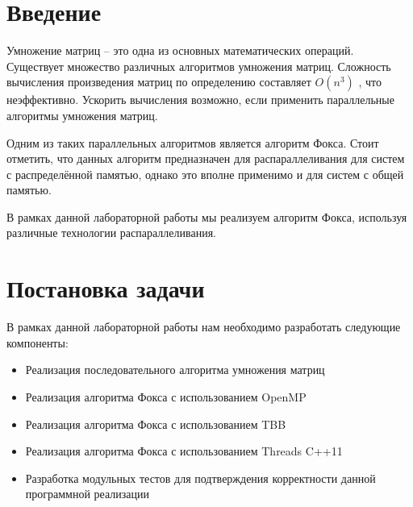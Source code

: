\documentclass{report}
\begin{document}
\section*{Введение}
Умножение матриц – это одна из основных математических операций. Существует множество различных алгоритмов умножения матриц. Сложность вычисления произведения матриц по определению составляет  \( O \left( n^{3} \right)  \) , что неэффективно. Ускорить вычисления возможно, если применить параллельные алгоритмы умножения матриц.\par

Одним из таких параллельных алгоритмов является алгоритм Фокса. Стоит отметить, что данных алгоритм предназначен для распараллеливания для систем с распределённой памятью, однако это вполне применимо и для систем с общей памятью.\par

В рамках данной лабораторной работы мы реализуем алгоритм Фокса, используя различные технологии распараллеливания.\par

\newpage

\section*{Постановка задачи}
В рамках данной лабораторной работы нам необходимо разработать следующие компоненты:\par

\begin{itemize}
	\item Реализация последовательного алгоритма умножения матриц\par

	\item Реализация алгоритма Фокса с использованием OpenMP\par

	\item Реализация алгоритма Фокса с использованием TBB\par

	\item Реализация алгоритма Фокса с использованием Threads C++11\par

	\item Разработка модульных тестов для подтверждения корректности данной программной реализации
\end{itemize}\par
\end{document}
